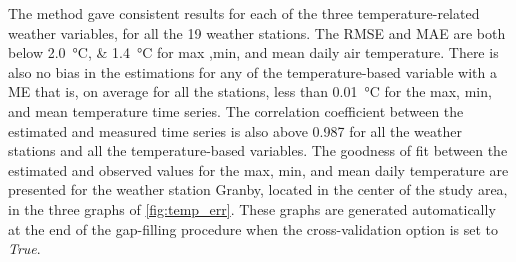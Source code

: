 \documentclass[TechnicalNoteMeteo.tex]{subfiles}
\begin{document}
The method gave consistent results for each of the three temperature-related weather variables, for all the 19 weather stations. The RMSE and MAE are both below \SIlist{2.0;1.4}{\celsius} for max ,min, and mean daily air temperature. There is also no bias in the estimations for any of the temperature-based variable with a ME that is, on average for all the stations, less than \SI{0.01}{\celsius} for the max, min, and mean temperature time series. The correlation coefficient between the estimated and measured time series is also above 0.987 for all the weather stations and all the temperature-based variables. The goodness of fit between the estimated and observed values for the max, min, and mean daily temperature are presented for the weather station Granby, located in the center of the study area, in the three graphs of \cref{fig:temp_err}. These graphs are generated automatically at the end of the gap-filling procedure when the cross-validation option is set to \emph{True}.
\end{document}

